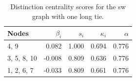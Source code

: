 \begin{table}
\centering
\caption{\label{tab:sw1}Distinction centrality scores for the sw graph with one long tie.}
\centering
\begin{tabular}[t]{lrrrr}
\toprule
Nodes & $\beta_i$ & $s_i$ & $\kappa_i$ & $\alpha$\\
\midrule
4, 9 & 0.082 & 1.000 & 0.694 & 0.776\\
3, 5, 8, 10 & -0.008 & 0.809 & 0.636 & 0.776\\
1, 2, 6, 7 & -0.033 & 0.809 & 0.661 & 0.776\\
\bottomrule
\end{tabular}
\end{table}
